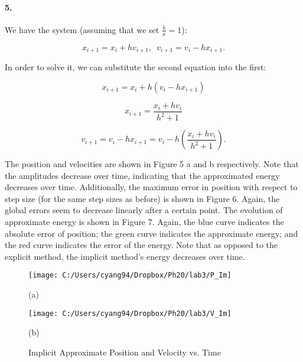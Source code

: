 \documentclass[english]{article}
\begin{document}
\paragraph{5.}

We have the system (assuming that we set $\frac{k}{x}=1$):

\begin{equation}
x_{i+1}=x_{i}+hv_{i+1},\,\,\, v_{i+1}=v_{i}-hx_{i+1}.\label{eq:2}
\end{equation}


In order to solve it, we can substitute the second equation into the
first:

\[
x_{i+1}=x_{i}+h(v_{i}-hx_{i+1})
\]


\begin{equation}
x_{i+1}=\frac{x_{i}+hv_{i}}{h^{2}+1}\label{eq:3}
\end{equation}


\begin{equation}
v_{i+1}=v_{i}-hx_{i+1}=v_{i}-h\left(\frac{x_{i}+hv_{i}}{h^{2}+1}\right).\label{eq:4}
\end{equation}


The position and velocities are shown in Figure 5 a and b respectively.
Note that the amplitudes decrease over time, indicating that the approximated
energy decreases over time. Additionally, the maximum error in position
with respect to step size (for the same step sizes as before) is shown
in Figure 6. Again, the global errors seem to decrease linearly after
a certain point. The evolution of approximate energy is shown in Figure
7. Again, the blue curve indicates the absolute error of position;
the green curve indicates the approximate energy; and the red curve
indicates the error of the energy. Note that as opposed to the explicit
method, the implicit method's energy decreases over time.

\begin{figure}[H]
\caption{Implicit Approximate Position and Velocity vs. Time}


\begin{minipage}[t]{0.5\columnwidth}%
\noindent \begin{center}
\texttt{[image: C:/Users/cyang94/Dropbox/Ph20/lab3/P\_Im]}
\par\end{center}

\noindent \begin{center}
(a)
\par\end{center}%
\end{minipage}%
\begin{minipage}[t]{0.5\columnwidth}%
\noindent \begin{center}
\texttt{[image: C:/Users/cyang94/Dropbox/Ph20/lab3/V\_Im]}
\par\end{center}

\noindent \begin{center}
(b)
\par\end{center}%
\end{minipage}
\end{figure}
\end{document}
